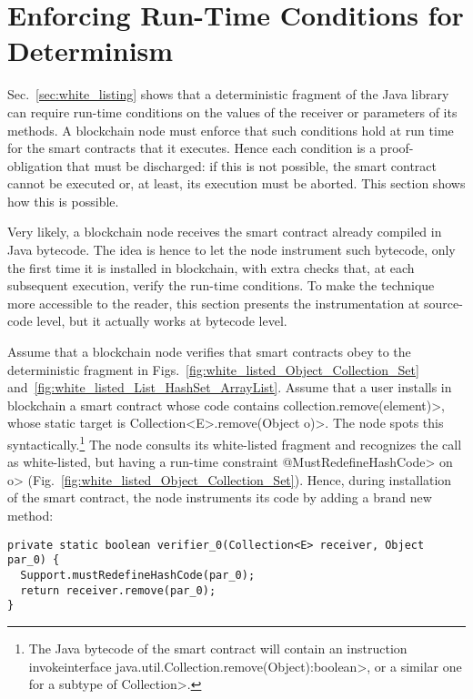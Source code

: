 \section{Enforcing Run-Time Conditions for Determinism}\label{sec:enforcing}

Sec.~\ref{sec:white_listing} shows that a deterministic fragment of the Java library
can require run-time conditions on the values of the receiver or
parameters of its methods. A blockchain node must enforce that such conditions hold
at run time for the smart contracts that it executes. Hence each condition
is a proof-obligation that must be discharged: if this is not possible, the smart contract
cannot be executed or, at least, its execution must be aborted. This section shows how
this is possible.

Very likely, a blockchain node receives the smart contract already compiled in Java bytecode.
The idea is hence to let the node instrument such bytecode, only the first time it is installed in blockchain,
with extra checks that, at each subsequent execution, verify the run-time conditions.
To make the technique more accessible to the reader, this section presents
the instrumentation at source-code level, but it actually works at bytecode level.

Assume that a blockchain node verifies that smart contracts obey to the deterministic
fragment in Figs.~\ref{fig:white_listed_Object_Collection_Set}
and~\ref{fig:white_listed_List_HashSet_ArrayList}.
Assume that a user installs in blockchain a smart contract whose
code contains \<collection.remove(element)>, whose static target is
\<Collection$\text{<}$E$\text{>}$.remove(Object o)>.
The node spots this syntactically.\footnote{The Java bytecode of the
  smart contract will
  contain an instruction \<invokeinterface java.util.Collection.remove(Object):boolean>,
  or a similar one for a subtype of \<Collection>.}
The node consults its white-listed fragment and recognizes the call as
white-listed, but having a run-time constraint \<@MustRedefineHashCode> on \<o>
(Fig.~\ref{fig:white_listed_Object_Collection_Set}). Hence, during installation of the
smart contract, the node instruments its code by adding a brand new method:

{\scriptsize\begin{verbatim}
private static boolean verifier_0(Collection<E> receiver, Object par_0) {
  Support.mustRedefineHashCode(par_0);
  return receiver.remove(par_0);
}
\end{verbatim}}

